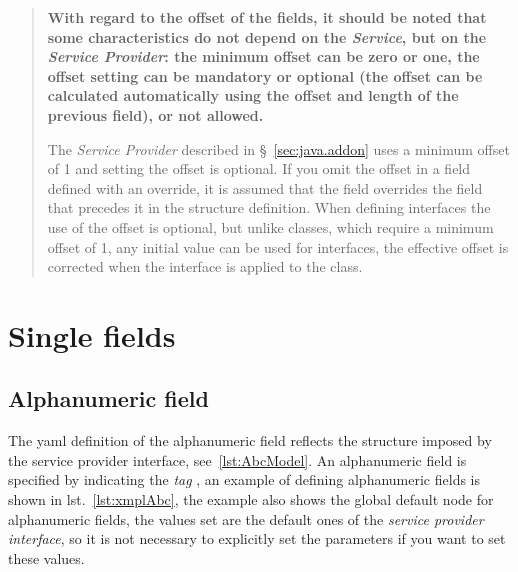 \begin{quote}\small\bf
With regard to the offset of the fields, it should be noted that some 
characteristics do not depend on the \textsl{Service}, but on the 
\textsl{Service Provider}: the minimum offset can be zero or one, the offset 
setting can be mandatory or optional (the offset can be calculated automatically 
using the offset and length of the previous field), or not allowed.

The \textsl{Service Provider} described in \S~\ref{sec:java.addon} uses a 
minimum offset of 1 and setting the offset is optional. If you omit the offset 
in a field defined with an override, it is assumed that the field overrides the 
field that precedes it in the structure definition. 
When defining interfaces the use of the offset is optional, but unlike classes, 
which require a minimum offset of 1, any initial value can be used for 
interfaces, the effective offset is corrected when the interface is applied to 
the class.
\end{quote}

\section{Single fields}

\subsection{Alphanumeric field} \label{sub:yaml.abc}
The yaml definition of the alphanumeric field reflects the structure imposed by 
the service provider interface, see~\ref{lst:AbcModel}. 
An alphanumeric field is specified by indicating the 
 \textsl{tag} , an example of 
defining alphanumeric fields is shown in lst.~\ref{lst:xmplAbc}, the example 
also shows the global default node for alphanumeric fields, the values set are 
the default ones of the \textsl{service provider interface}, so it is not 
necessary to explicitly set the parameters if you want to set these values.

